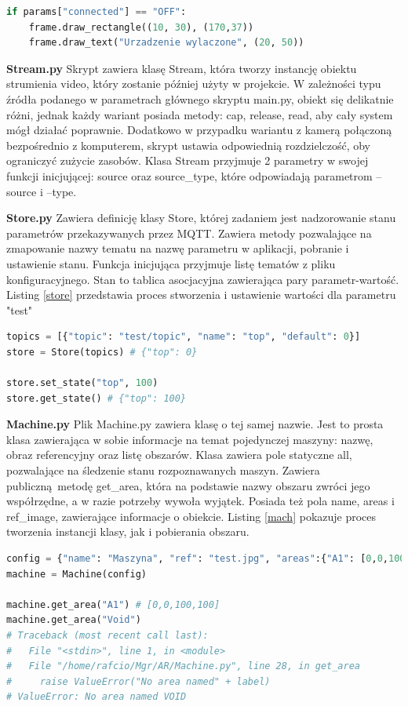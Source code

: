 \documentclass[12pt,twoside,polish]{article}
\begin{document}
\begin{lstlisting}[language=Python,caption=Uruchomienie systemu,label=draw_fn]
if params["connected"] == "OFF":
	frame.draw_rectangle((10, 30), (170,37))
	frame.draw_text("Urzadzenie wylaczone", (20, 50))
\end{lstlisting}

\textbf{Stream.py}
Skrypt zawiera klasę Stream, która tworzy instancję obiektu strumienia video, który zostanie później użyty w projekcie. W zależności typu źródła podanego w parametrach głównego skryptu main.py, obiekt się delikatnie różni, jednak każdy wariant posiada metody: cap, release, read, aby cały system mógł działać poprawnie. Dodatkowo w przypadku wariantu z kamerą połączoną bezpośrednio z komputerem, skrypt ustawia odpowiednią rozdzielczość, oby ograniczyć zużycie zasobów. Klasa Stream przyjmuje 2 parametry w swojej funkcji inicjującej: source oraz source\_type, które odpowiadają parametrom --source i --type.


\textbf{Store.py}
Zawiera definicję klasy Store, której zadaniem jest nadzorowanie stanu parametrów przekazywanych przez MQTT. Zawiera metody pozwalające na zmapowanie nazwy tematu na nazwę parametru w aplikacji, pobranie i ustawienie stanu. Funkcja inicjująca przyjmuje listę tematów z pliku konfiguracyjnego. Stan to tablica asocjacyjna zawierająca pary parametr-wartość. Listing \ref{store} przedstawia proces stworzenia i ustawienie wartości dla parametru "test"

\begin{lstlisting}[language=Python,label=store,caption=Uruchomienie systemu]
topics = [{"topic": "test/topic", "name": "top", "default": 0}]
store = Store(topics) # {"top": 0}

store.set_state("top", 100)
store.get_state() # {"top": 100}
\end{lstlisting}

\textbf{Machine.py}
Plik Machine.py zawiera klasę o tej samej nazwie. Jest to prosta klasa zawierająca w sobie informacje na temat pojedynczej maszyny: nazwę, obraz referencyjny oraz listę obszarów. Klasa zawiera pole statyczne all, pozwalające na śledzenie stanu rozpoznawanych maszyn. Zawiera publiczną metodę get\_area, która na podstawie nazwy obszaru zwróci jego współrzędne, a w razie potrzeby wywoła wyjątek. Posiada też pola name, areas i ref\_image, zawierające informacje o obiekcie. Listing \ref{mach} pokazuje proces tworzenia instancji klasy, jak i pobierania obszaru.

\begin{lstlisting}[language=Python,label=mach, caption=Stworzenie instancji Machine]
config = {"name": "Maszyna", "ref": "test.jpg", "areas":{"A1": [0,0,100,100]}}
machine = Machine(config)

machine.get_area("A1") # [0,0,100,100]
machine.get_area("Void")
# Traceback (most recent call last):
#   File "<stdin>", line 1, in <module>
#   File "/home/rafcio/Mgr/AR/Machine.py", line 28, in get_area
#     raise ValueError("No area named" + label)
# ValueError: No area named VOID 
\end{lstlisting}
\end{document}
